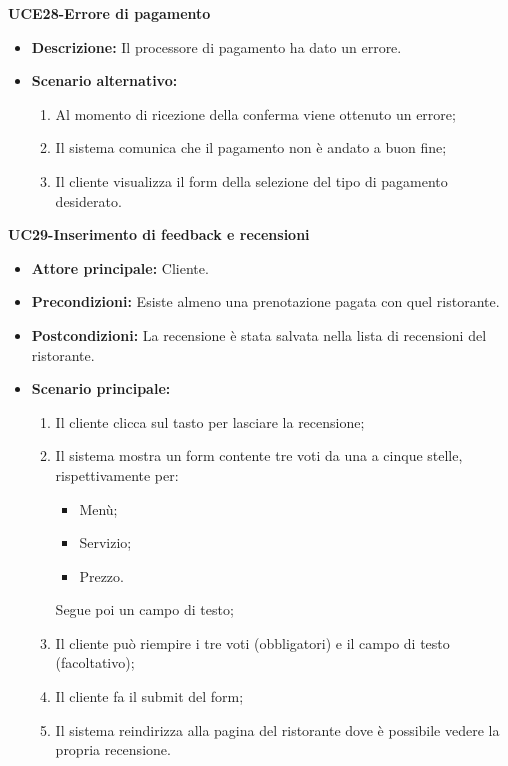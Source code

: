\begin{itemize}
\begin{itemize}
\textbf{UCE28-Errore di pagamento}
\begin{itemize}
\item \textbf{Descrizione: } Il processore di pagamento ha dato un errore.
\item \textbf{Scenario alternativo:}
\begin{enumerate}
    \item Al momento di ricezione della conferma viene ottenuto un errore;
    \item Il sistema comunica che il pagamento non è andato a buon fine;
    \item Il cliente visualizza il form della selezione del tipo di pagamento desiderato.
\end{enumerate}
\end{itemize}

\textbf{UC29-Inserimento di feedback e recensioni}
\begin{itemize}
\item \textbf{Attore principale:} Cliente.
\item \textbf{Precondizioni:} Esiste almeno una prenotazione pagata con quel ristorante.
\item \textbf{Postcondizioni:} La recensione è stata salvata nella lista di recensioni del ristorante.
\item \textbf{Scenario principale:}
\begin{enumerate}
    \item Il cliente clicca sul tasto per lasciare la recensione;
    \item Il sistema mostra un form contente tre voti da una a cinque stelle, rispettivamente per:
  \begin{itemize}
    \item Menù;
    \item Servizio;
    \item Prezzo.
  \end{itemize}
      Segue poi un campo di testo;
    \item Il cliente può riempire i tre voti (obbligatori) e il campo di testo (facoltativo);
    \item Il cliente fa il submit del form;
    \item Il sistema reindirizza alla pagina del ristorante dove è possibile vedere la propria recensione.
\end{enumerate}
\end{itemize}


\end{itemize}
\end{itemize}
